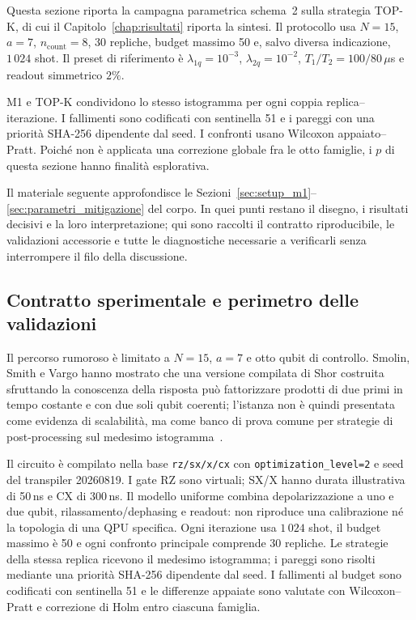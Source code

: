 \begin{onehalfspace}

Questa sezione riporta la campagna parametrica schema~2 sulla
strategia TOP-K, di cui il Capitolo~\ref{chap:risultati} riporta la sintesi. Il protocollo usa $N=15$, $a=7$,
$n_{\mathrm{count}}=8$, 30 repliche, budget massimo 50 e, salvo diversa
indicazione, $1\,024$ shot. Il preset di riferimento è
$\lambda_{1q}=10^{-3}$, $\lambda_{2q}=10^{-2}$,
$T_1/T_2=100/80\,\mu$s e readout simmetrico $2\%$.

M1 e TOP-K condividono lo stesso istogramma per ogni coppia
replica--iterazione. I fallimenti sono codificati con sentinella 51 e i
pareggi con una priorità SHA-256 dipendente dal seed. I confronti usano
Wilcoxon appaiato--Pratt. Poiché non è applicata una correzione globale
fra le otto famiglie, i $p$ di questa sezione hanno finalità
esplorativa.

Il materiale seguente approfondisce le Sezioni~\ref{sec:setup_m1}--\ref{sec:parametri_mitigazione}
del corpo. In quei punti restano il disegno, i risultati decisivi e la loro interpretazione;
qui sono raccolti il contratto riproducibile, le validazioni accessorie e tutte le diagnostiche
necessarie a verificarli senza interrompere il filo della discussione.

\subsection{Contratto sperimentale e perimetro delle validazioni}
\label{app:fase1_contratto}

Il percorso rumoroso è limitato a $N=15$, $a=7$ e otto qubit di
controllo. Smolin, Smith e Vargo hanno mostrato che una versione compilata
di Shor costruita sfruttando la conoscenza della risposta può fattorizzare
prodotti di due primi in tempo costante e con due soli qubit coerenti;
l'istanza non è quindi presentata come evidenza di scalabilità, ma come
banco di prova comune per strategie di post-processing sul medesimo
istogramma~\cite{smolin2013}.

Il circuito è compilato nella base \texttt{rz/sx/x/cx} con
\texttt{optimization\_level=2} e seed del transpiler 20260819. I gate RZ
sono virtuali; SX/X hanno durata illustrativa di 50\,ns e CX di 300\,ns.
Il modello uniforme combina depolarizzazione a uno e due qubit,
rilassamento/dephasing e readout: non riproduce una calibrazione né la
topologia di una QPU specifica. Ogni iterazione usa $1\,024$ shot, il budget
massimo è 50 e ogni confronto principale comprende 30 repliche. Le
strategie della stessa replica ricevono il medesimo istogramma; i pareggi
sono risolti mediante una priorità SHA-256 dipendente dal seed. I fallimenti
al budget sono codificati con sentinella 51 e le differenze appaiate sono
valutate con Wilcoxon--Pratt e correzione di Holm entro ciascuna famiglia.


\end{onehalfspace}
